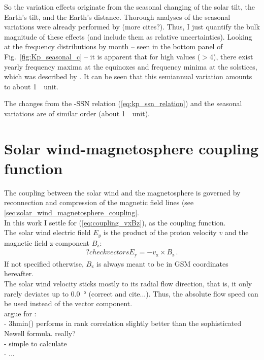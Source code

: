 So the \Kp{} variation effects originate from the seasonal changing of the solar tilt, the Earth's tilt, and the Earth's distance. Thorough analyses of the seasonal variations were already performed by \citep{Cortie1912} (more cites?). Thus, I just quantify the bulk magnitude of these effects (and include them as relative uncertainties). Looking at the \Kp{} frequency distributions by month -- seen in the bottom panel of Fig.~\ref{fig:Kp_seasonal_c} -- it is apparent that for high \Kp{} values ($>4$), there exist yearly frequency maxima at the equinoxes and frequency minima at the solstices, which was described by \citep{Cortie1912}. It can be seen that this semiannual variation amounts to about 1~\Kp~unit.

The changes from the \Kp{}-SSN relation (\ref{eq:kp_ssn_relation}) and the seasonal variations are of similar order (about 1~\Kp{}~unit).\\


\section{Solar wind-magnetosphere coupling function}

The coupling between the solar wind and the magnetosphere is governed by reconnection and compression of the magnetic field lines (see \autoref{sec:solar_wind_magnetosphere_coupling}.\\

In this work I settle for (\autoref{eq:coupling_vxBz}), \vBz{} as the coupling function.\\

The solar wind electric field $E_y$ is the product of the proton velocity $v$ and the magnetic field z-component $B_\text{z}$:
\begin{align}
	?check vectors  E_\text{y} = -v_\text{x} \times B_\text{z}\,.
\end{align}
If not specified otherwise, $B_\text{z}$ is always meant to be in GSM coordinates hereafter.\\


The solar wind velocity sticks mostly to its radial flow direction, that is, it only rarely deviates up to \SI{0.0}{\degree} (correct and cite...). Thus, the absolute flow speed can be used instead of the vector component.\\

argue for \vBz:\\
- 3hmin(\vBz) performs in rank correlation slightly better than the sophisticated Newell formula. really?\\
- simple to calculate\\
- ...\\

